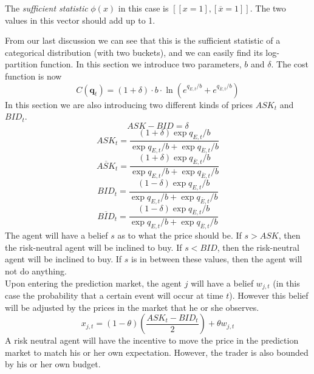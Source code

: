 \documentclass{article}
\begin{document}
    The \emph{sufficient statistic} $\phi(x)$ in this case is $[[x=1], [\overline{x}=1]]$. The two values in this vector should add up to 1.

    From our last discussion we can see that this is the sufficient statistic of a categorical distribution (with two buckets), and we can easily find its log-partition function. In this section we introduce two parameters, $b$ and $\delta$. The cost function is now
    \begin{displaymath}
        C(\textbf{q}_t)=(1+\delta)\cdot b \cdot \ln({e^{q_{E,t}/b}+e^{q_{\overline{E},t}/b}})
    \end{displaymath}
    In this section we are also introducing two different kinds of prices $ASK_t$ and $BID_t$.
    \begin{displaymath}
        ASK-BID = \delta
    \end{displaymath}
    \begin{displaymath}
        ASK_t=\frac{(1+\delta)\exp{q_{E,t}/b}}{\exp{q_{E,t}/b}+\exp{q_{\overline{E},t}/b}}
    \end{displaymath}
    \begin{displaymath}
        \overline{ASK}_t=\frac{(1+\delta)\exp{q_{\overline{E},t}/b}}{\exp{q_{E,t}/b}+\exp{q_{\overline{E},t}/b}}
    \end{displaymath}
    \begin{displaymath}
        BID_t=\frac{(1-\delta)\exp{q_{E,t}/b}}{\exp{q_{E,t}/b}+\exp{q_{\overline{E},t}/b}}
    \end{displaymath}
    \begin{displaymath}
        \overline{BID}_t=\frac{(1-\delta)\exp{q_{\overline{E},t}/b}}{\exp{q_{E,t}/b}+\exp{q_{\overline{E},t}/b}}
    \end{displaymath}
    The agent will have a belief $s$ as to what the price should be. If $s>ASK$, then the risk-neutral agent will be inclined to buy. If $s<BID$, then the risk-neutral agent will be inclined to buy. If $s$ is in between these values, then the agent will not do anything. \\
    Upon entering the prediction market, the agent $j$ will have a belief $w_{j,t}$ (in this case the probability that a certain event will occur at time $t$). However this belief will be adjusted by the prices in the market that he or she observes.
    \begin{displaymath}
        x_{j,t}=(1-\theta)\left(\frac{ASK_t-BID_t}{2}\right)+\theta w_{j,t}
    \end{displaymath}
    A risk neutral agent will have the incentive to move the price in the prediction market to match his or her own expectation. However, the trader is also bounded by his or her own budget.
\end{document}
